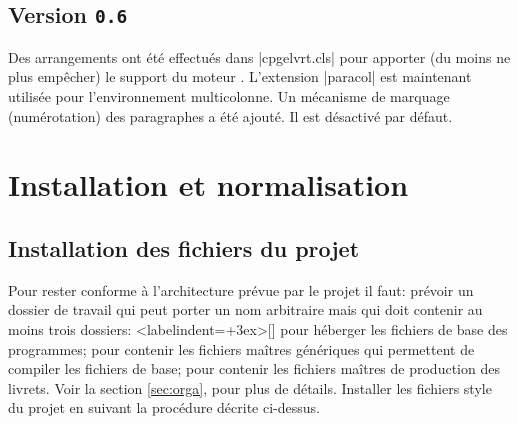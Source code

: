 \documentclass[other,openany]{cpgelvrt}
\let\FILE\file
\renewcommand\file[1]{{\color{fs}\FILE{#1}}}
\begin{document}
\subsection*{Version \texttt{0.6}}
Des arrangements ont été effectués dans |cpgelvrt.cls| pour apporter (du moins ne plus empêcher) le  support du moteur \LuaTeX{}. L'extension |paracol| est maintenant utilisée pour l'environnement multicolonne. Un mécanisme de marquage (numérotation) des paragraphes a été ajouté. Il est désactivé par défaut.

\section{Installation et normalisation}

\subsection{Installation des fichiers du projet}
Pour rester conforme à l'architecture prévue par le projet il faut:
\pcit prévoir un dossier de travail qui peut porter un nom arbitraire mais qui doit contenir au moins trois dossiers:  
\pcit<labelindent=\leftmargin+3ex>[] 
pour héberger les fichiers de base des programmes; 
\pcit[\file{Generic}] pour contenir les fichiers maîtres génériques qui permettent de compiler les fichiers de base;
\pcit[\file{Masters}] pour contenir les fichiers maîtres de production des livrets. 
\pcclose 
Voir la section \ref{sec:orga},  pour plus de détails.
\pcit Installer les fichiers style du projet en suivant la procédure décrite ci-dessus. 
\pcclose
\end{document}
